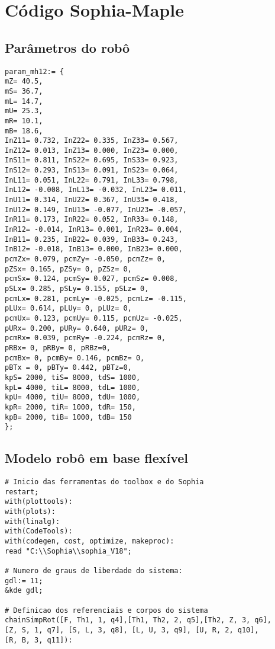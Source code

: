 \appendix
\chapter{Código Sophia-Maple}\label{apendiceA}

\section{Parâmetros do robô}


\begin{lstlisting}         
param_mh12:= {
mZ= 40.5,
mS= 36.7,
mL= 14.7,
mU= 25.3,
mR= 10.1,
mB= 18.6,
InZ11= 0.732, InZ22= 0.335, InZ33= 0.567, 
InZ12= 0.013, InZ13= 0.000, InZ23= 0.000,
InS11= 0.811, InS22= 0.695, InS33= 0.923, 
InS12= 0.293, InS13= 0.091, InS23= 0.064,
InL11= 0.051, InL22= 0.791, InL33= 0.798, 
InL12= -0.008, InL13= -0.032, InL23= 0.011,
InU11= 0.314, InU22= 0.367, InU33= 0.418, 
InU12= 0.149, InU13= -0.077, InU23= -0.057,
InR11= 0.173, InR22= 0.052, InR33= 0.148, 
InR12= -0.014, InR13= 0.001, InR23= 0.004,
InB11= 0.235, InB22= 0.039, InB33= 0.243, 
InB12= -0.018, InB13= 0.000, InB23= 0.000,
pcmZx= 0.079, pcmZy= -0.050, pcmZz= 0,
pZSx= 0.165, pZSy= 0, pZSz= 0,
pcmSx= 0.124, pcmSy= 0.027, pcmSz= 0.008,
pSLx= 0.285, pSLy= 0.155, pSLz= 0,
pcmLx= 0.281, pcmLy= -0.025, pcmLz= -0.115,
pLUx= 0.614, pLUy= 0, pLUz= 0,
pcmUx= 0.123, pcmUy= 0.115, pcmUz= -0.025,
pURx= 0.200, pURy= 0.640, pURz= 0,
pcmRx= 0.039, pcmRy= -0.224, pcmRz= 0,
pRBx= 0, pRBy= 0, pRBz=0,
pcmBx= 0, pcmBy= 0.146, pcmBz= 0,
pBTx = 0, pBTy= 0.442, pBTz=0,
kpS= 2000, tiS= 8000, tdS= 1000,
kpL= 4000, tiL= 8000, tdL= 1000,
kpU= 4000, tiU= 8000, tdU= 1000,
kpR= 2000, tiR= 1000, tdR= 150,
kpB= 2000, tiB= 1000, tdB= 150
};
\end{lstlisting}

\section{Modelo robô em base flexível}

\begin{lstlisting}
# Inicio das ferramentas do toolbox e do Sophia
restart;
with(plottools):
with(plots):
with(linalg):
with(CodeTools):
with(codegen, cost, optimize, makeproc):
read "C:\\Sophia\\sophia_V18";

# Numero de graus de liberdade do sistema:
gdl:= 11;
&kde gdl;

# Definicao dos referenciais e corpos do sistema
chainSimpRot([F, Th1, 1, q4],[Th1, Th2, 2, q5],[Th2, Z, 3, q6], 
[Z, S, 1, q7], [S, L, 3, q8], [L, U, 3, q9], [U, R, 2, q10], 
[R, B, 3, q11]):



\end{lstlisting}


